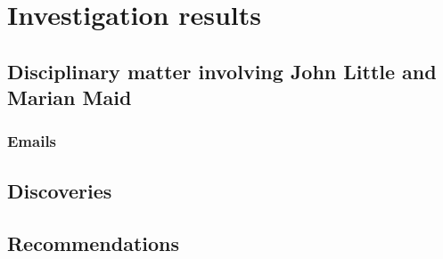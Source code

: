 \section{Investigation results}
\subsection{Disciplinary matter involving John Little and Marian Maid}
\subsubsection{Emails}
\subsection{Discoveries}
\subsection{Recommendations}